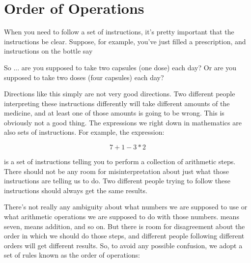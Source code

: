 %
%

\section{Order of Operations}
\label{OrderofOperations}

When you need to follow a set of instructions, it’s pretty important that the instructions be clear.  Suppose, for example, you’ve just filled a prescription, and instructions on the bottle say 

So ... are you supposed to take two capsules (one dose) each day? Or are you supposed to take two doses (four capsules) each day?

Directions like this simply are not very good directions. Two different people interpreting these instructions differently will take different amounts of the medicine, and at least one of those amounts is going to be wrong. This is obviously not a good thing.  The expressions we right down in mathematics are also sets of instructions. For example, the expression:

$$7+1-3*2$$	

is a set of instructions telling you to perform a collection of arithmetic steps. There should not be any room for misinterpretation about just what those instructions are telling us to do. Two different people trying to follow these instructions should always get the same results.

There’s not really any ambiguity about what numbers we are supposed to use or what arithmetic operations we are supposed to do with those numbers.  means seven, \quotes{+} means addition, and so on. But there is room for disagreement about the order in which we should do those steps, and different people following different orders will get different results. So, to avoid any possible confusion, we adopt a set of rules known as the order of operations:

%
%

